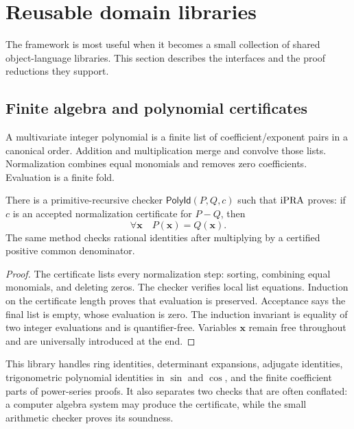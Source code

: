 \section{Reusable domain libraries}
\label{sec:domains}

The framework is most useful when it becomes a small collection of shared
object-language libraries.  This section describes the interfaces and the
proof reductions they support.

\subsection{Finite algebra and polynomial certificates}

A multivariate integer polynomial is a finite list of coefficient/exponent
pairs in a canonical order.  Addition and multiplication merge and convolve
those lists.  Normalization combines equal monomials and removes zero
coefficients.  Evaluation is a finite fold.

\begin{proposition}
\label{prop:poly-reflection}
There is a primitive-recursive checker
\(\mathsf{PolyId}(P,Q,c)\) such that \(\mathrm{iPRA}\) proves: if \(c\) is an accepted
normalization certificate for \(P-Q\), then
\[
 \forall \mathbf x\quad P(\mathbf x)=Q(\mathbf x).
\]
The same method checks rational identities after multiplying by a certified
positive common denominator.
\end{proposition}

\begin{proof}
The certificate lists every normalization step: sorting, combining equal
monomials, and deleting zeros.  The checker verifies local list equations.
Induction on the certificate length proves that evaluation is preserved.
Acceptance says the final list is empty, whose evaluation is zero.  The
induction invariant is equality of two integer evaluations and is
quantifier-free.  Variables \(\mathbf x\) remain free throughout and are
universally introduced at the end.
\end{proof}

This library handles ring identities, determinant expansions, adjugate
identities, trigonometric polynomial identities in \(\sin\) and \(\cos\), and
the finite coefficient parts of power-series proofs.  It also separates two
checks that are often conflated: a computer algebra system may produce the
certificate, while the small arithmetic checker proves its soundness.

